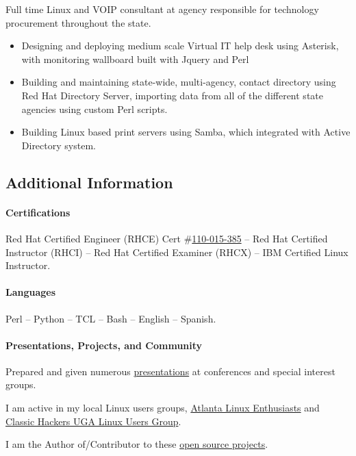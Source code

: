 \documentclass[fontsize=11pt]{scrartcl}
\begin{document}
Full time Linux and VOIP consultant at agency responsible for technology
procurement throughout the state.

\begin{itemize}
\item
  Designing and deploying medium scale Virtual IT help desk using
  Asterisk, with monitoring wallboard built with Jquery and Perl
\item
  Building and maintaining state-wide, multi-agency, contact directory
  using Red Hat Directory Server, importing data from all of the
  different state agencies using custom Perl scripts.
\item
  Building Linux based print servers using Samba, which integrated with
  Active Directory system.
\end{itemize}

\subsection{Additional Information}\label{additional-information}

\paragraph{Certifications}\label{certifications}

Red Hat Certified Engineer (RHCE) Cert
\#\href{https://www.redhat.com/wapps/training/certification/verify.html?certNumber=110-015-385\&verify=Verify}{110-015-385}
-- Red Hat Certified Instructor (RHCI) -- Red Hat Certified Examiner
(RHCX) -- IBM Certified Linux Instructor.

\paragraph{Languages}\label{languages}

Perl -- Python -- TCL -- Bash -- English -- Spanish.

\paragraph{Presentations, Projects, and
Community}\label{presentations-projects-and-community}

Prepared and given numerous
\href{http://presentation.goozbach.com/}{presentations} at conferences
and special interest groups.

I am active in my local Linux users groups,
\href{http://ale.org/}{Atlanta Linux Enthusiasts} and
\href{http://chugalug.uga.edu/}{Classic Hackers UGA Linux Users Group}.

I am the Author of/Contributor to these
\href{http://github.com/goozbach/}{open source projects}.
\end{document}
